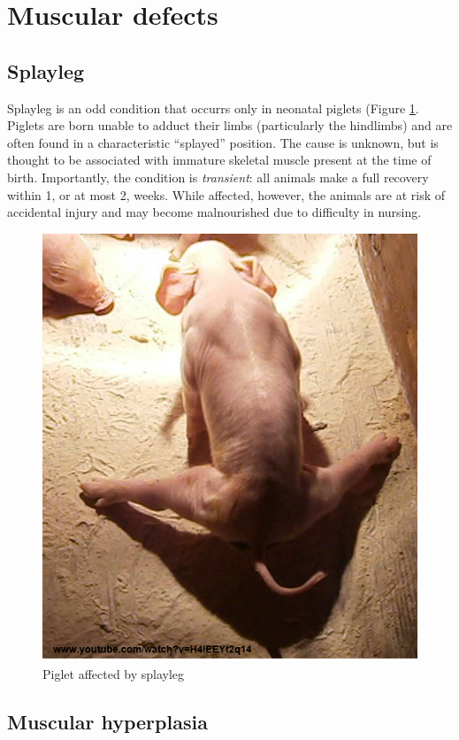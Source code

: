 \documentclass[openany]{book}
\begin{document}
\section{Muscular defects}\label{muscular-defects}

\subsection{Splayleg}\label{splayleg}

Splayleg is an odd condition that occurrs only in neonatal piglets
(Figure \ref{fig:splayleg}. Piglets are born unable to adduct their
limbs (particularly the hindlimbs) and are often found in a
characteristic ``splayed'' position. The cause is unknown, but is
thought to be associated with immature skeletal muscle present at the
time of birth. Importantly, the condition is \emph{transient}: all
animals make a full recovery within 1, or at most 2, weeks. While
affected, however, the animals are at risk of accidental injury and may
become malnourished due to difficulty in nursing.

\begin{figure}

{\centering \includegraphics[width=0.6\linewidth]{images/splayleg} 

}

\caption{Piglet affected by splayleg}\label{fig:splayleg}
\end{figure}

\subsection{Muscular hyperplasia}\label{muscular-hyperplasia}
\end{document}
